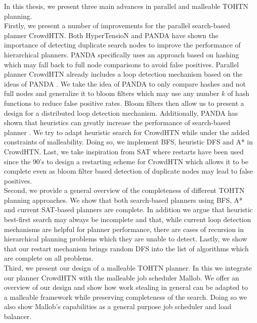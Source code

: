 \documentclass[enabledeprecatedfontcommands,12pt,a4paper,twoside]{scrartcl}
\numberwithin{equation}{section}
\begin{document}
In this thesis, we present three main advances in parallel and malleable TOHTN planning. \\
Firstly, we present a number of improvements for the parallel search-based planner CrowdHTN.
Both HyperTensioN \cite{magnaguagno2020hypertension} and PANDA \cite{holler2021loop} have shown the importance of detecting duplicate search nodes to improve the performance of hierarchical planners. PANDA specifically uses an approach based on hashing which may fall back to full node comparisons to avoid false positives. Parallel planner CrowdHTN already includes a loop detection mechanism based on the ideas of PANDA \cite{bretl2021parallel}. We take the idea of PANDA to only compare hashes and not full nodes and generalize it to bloom filters which may use any number $k$ of hash functions to reduce false positive rates. Bloom filters then allow us to present a design for a distributed loop detection mechanism. Additionally, PANDA has shown that heuristics can greatly increase the performance of search-based planner \cite{holler2020htn}. We try to adapt heuristic search for CrowdHTN while under the added constraints of malleability. Doing so, we implement BFS, heuristic DFS and A* in CrowdHTN.
Last, we take inspiration from SAT where restarts have been used since the 90's \cite{crawford1994experimental} to design a restarting scheme for CrowdHTN which allows it to be complete even as bloom filter based detection of duplicate nodes may lead to false positives. \\
Second, we provide a general overview of the completeness of different TOHTN planning approaches. We show that both search-based planners using BFS, A* and current SAT-based planners are complete. In addition we argue that heuristic best-first search may always be incomplete and that, while current loop detection mechanisms are helpful for planner performance, there are cases of recursion in hierarchical planning problems which they are unable to detect. Lastly, we show that our restart mechanism brings random DFS into the list of algorithms which are complete on all problems. \\
Third, we present our design of a malleable TOHTN planner. In this we integrate our planner CrowdHTN with the malleable job scheduler Mallob. We offer an overview of our design and show how work stealing in general can be adapted to a malleable framework while preserving completeness of the search. Doing so we also show Mallob's capabilities as a general purpose job scheduler and load balancer.\\
\end{document}
